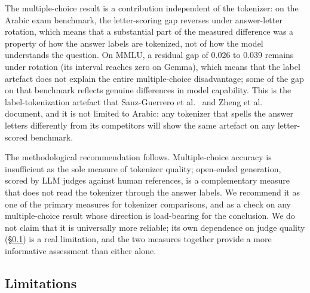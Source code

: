 \documentclass[a4paper,fleqn]{cas-sc}
\begin{document}
The multiple-choice result is a contribution independent of the tokenizer: on the Arabic exam benchmark, the letter-scoring gap reverses under answer-letter rotation, which means that a substantial part of the measured difference was a property of how the answer labels are tokenized, not of how the model understands the question. On MMLU, a residual gap of 0.026 to 0.039 remains under rotation (its interval reaches zero on Gemma), which means that the label artefact does not explain the entire multiple-choice disadvantage; some of the gap on that benchmark reflects genuine differences in model capability. This is the label-tokenization artefact that Sanz-Guerrero et al.\ \citep{sanzguerrero2025mind} and Zheng et al.\ \citep{zheng2024large} document, and it is not limited to Arabic: any tokenizer that spells the answer letters differently from its competitors will show the same artefact on any letter-scored benchmark.

The methodological recommendation follows. Multiple-choice accuracy is insufficient as the sole measure of tokenizer quality; open-ended generation, scored by LLM judges against human references, is a complementary measure that does not read the tokenizer through the answer labels. We recommend it as one of the primary measures for tokenizer comparisons, and as a check on any multiple-choice result whose direction is load-bearing for the conclusion. We do not claim that it is universally more reliable; its own dependence on judge quality (\S\ref{sec:discussion:limitations}) is a real limitation, and the two measures together provide a more informative assessment than either alone.

\subsection{Limitations}
\label{sec:discussion:limitations}
\end{document}
